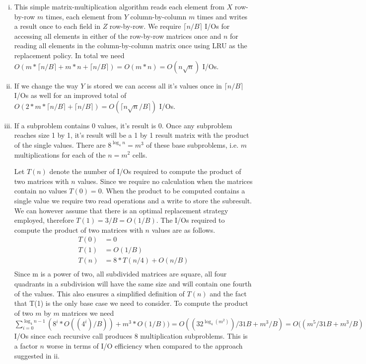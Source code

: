 \begin{enumerate}[(i)]
	\item
This simple matrix-multiplication algorithm reads each element from $X$ row-by-row $m$ times, each element from $Y$ column-by-column $m$ times and writes a result once to each field in $Z$ row-by-row. We require $\lceil n/B \rceil$ I/Os for accessing all elements in either of the row-by-row matrices once and $n$ for reading all elements in the column-by-column matrix once using \textsc{LRU} as the replacement policy. In total we need $O(m * \lceil n/B \rceil + m * n + \lceil n/B \rceil) = O(m * n) = O(n\sqrt{n})$ I/Os.
	\item
If we change the way $Y$ is stored we can access all it's values once in $\lceil n/B \rceil$ I/Os as well for an improved total of $O(2 * m * \lceil n/B \rceil +  \lceil n/B \rceil) = O(\lceil n\sqrt{n}/B \rceil)$ I/Os.
	\item
If a subproblem contains 0 values, it's result is 0. Once any subproblem reaches size 1 by 1, it's result will be a 1 by 1 result matrix with the product of the single values. There are $8^{\log_4{n}} = m^3$ of these base subproblems, i.e. $m$ multiplications for each of the $n = m^2$ cells. 

Let $T(n)$ denote the number of I/Os required to compute the product of two matrices with $n$ values.
Since we require no calculation when the matrices contain no values $T(0) = 0$.
When the product to be computed contains a single value we require two read operations and a write to store the subresult. We can however assume that there is an optimal replacement strategy employed, therefore $T(1) = 3/B = O(1/B)$.
The I/Os required to compute the product of two matrices with $n$ values are as follows.
\begin{equation}
\begin{split}
T(0) &= 0\\
T(1) &= O(1/B)\\
T(n) &= 8*T(n/4) + O(n/B)\\
\end{split}
\end{equation}
Since m is a power of two, all subdivided matrices are square, all four quadrants in a subdivision will have the same size and will contain one fourth of the values. This also ensures a simplified definition of $T(n)$ and the fact that T(1) is the only base case we need to consider. To compute the product of two $m$ by $m$ matrices we need $\sum_{i=0}^{\log_4{n}-1} (8^i * O((4^i)/B)) + m^3 * O(1/B)) = O((32^{\log_4(m^2)})/31B + m^3/B) = O((m^5/31B + m^3/B) = O(m^5/B) = O(n^2\sqrt{n}/B)$ I/Os since each recursive call produces 8 multiplication subproblems. This is a factor $n$ worse in terms of I/O efficiency when compared to the approach suggested in ii.


\end{enumerate}
